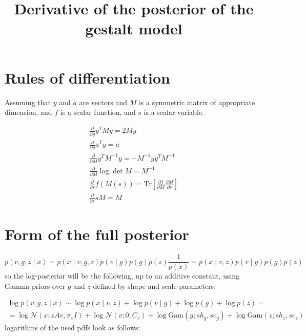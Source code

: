 \documentclass{paper}
\begin{document}
\title{Derivative of the posterior of the gestalt model}
\maketitle


\section{Rules of differentiation}

Assuming that $y$ and $a$ are vectors and $M$ is a symmetric matrix of appropriate dimension, and $f$ is a scalar function, and $s$ is a scalar variable.

\begin{eqnarray}
\frac{\partial}{\partial y} y^T M y = 2 M y \label{eq:deriv_quadratic} \\
\frac{\partial}{\partial y} a^T y = a \label{eq:deriv_scalarprod} \\
\frac{\partial}{\partial M} y^T M^{-1} y = - M^{-1} yy^T M^{-1} \label{eq:deriv_quad_mat} \\
\frac{\partial}{\partial M} \log \det M = M^{-1} \label{eq:deriv_logdet} \\
\frac{\partial}{\partial s} f(M(s)) = \textrm{Tr} \left[ \frac{\partial f}{\partial M} \frac{\partial M}{\partial s} \right] \label{eq:deriv_chain} \\
\frac{\partial}{\partial s} s M = M \label{eq:deriv_scalar}
\end{eqnarray}


\section{Form of the full posterior}

\begin{equation}
p(v,g,z \mid x) = p(x \mid v,g,z) p(v \mid g) p(g) p(z) \frac{1}{p(x)} \sim  p(x \mid v,z) p(v \mid g) p(g) p(z)
\end{equation}
%
so the log-posterior will be the following, up to an additive constant, using Gamma priors over $g$ and $z$ defined by shape and scale parameters:

\begin{equation}
\begin{split}
\log p(v,g,z \mid x) \sim \log p(x \mid v,z) + \log p(v \mid g) + \log p(g) + \log p(z) = \\
= \log \mathcal{N}(x;zAv,\sigma_x I) + \log \mathcal{N}(v;0,C_v) + \log \textrm{Gam}(g;sh_g,sc_g) + \log \textrm{Gam}(z;sh_z,sc_z)
\end{split}
\end{equation}
%
logarithms of the used pdfs look as follows:
\end{document}

